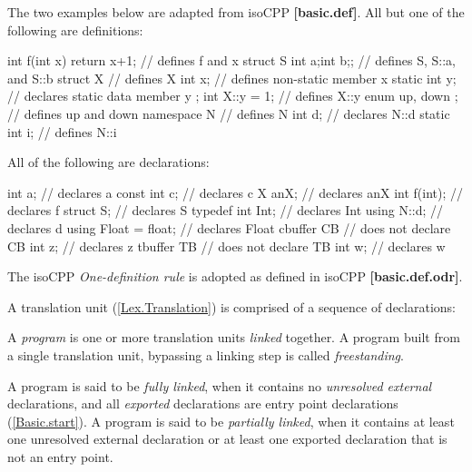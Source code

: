 \p The two examples below are adapted from \gls{isoCPP} \textbf{[basic.def]}. All
but one of the following are definitions:
\begin{HLSL}
int f(int x) { return x+1; } // defines f and x
struct S {int a;int b;};     // defines S, S::a, and S::b
struct X {                   // defines X
  int x;                     // defines non-static member x
  static int y;              // declares static data member y
};
int X::y = 1;                // defines X::y
enum { up, down };           // defines up and down
namespace N {                // defines N
int d;                       // declares N::d
static int i;                // defines N::i
}
\end{HLSL}

\p All of the following are declarations:
\begin{HLSL}
int a;                       // declares a
const int c;                 // declares c
X anX;                       // declares anX
int f(int);                  // declares f
struct S;                    // declares S
typedef int Int;             // declares Int
using N::d;                  // declares d
using Float = float;         // declares Float
cbuffer CB {                 // does not declare CB
  int z;                     // declares z
}
tbuffer TB {                 // does not declare TB
  int w;                     // declares w
}
\end{HLSL}


\p The \gls{isoCPP} \textit{One-definition rule} is adopted as defined in
\gls{isoCPP} \textbf{[basic.def.odr]}.




\p A translation unit (\ref{Lex.Translation}) is comprised of a sequence of
declarations:

\begin{grammar}
  \br
\end{grammar}

\p A \textit{program} is one or more translation units \textit{linked} together.
A program built from a single translation unit, bypassing a linking step is
called \textit{freestanding}.

\p A program is said to be \textit{fully linked}, when it contains no
\textit{unresolved external} declarations, and all \textit{exported}
declarations are entry point declarations (\ref{Basic.start}). A program is said
to be \textit{partially linked}, when it contains at least one unresolved
external declaration or at least one exported declaration that is not an entry
point.

